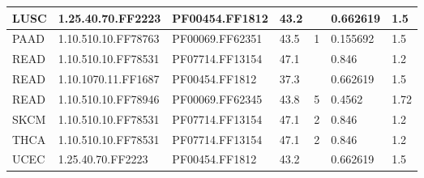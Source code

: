 \documentclass[a4paper, 11pt]{article}
\begin{document}
\begin{table}[!htbp]
\begin{tabular}{|l|l|l|l|l|l|l|}
LUSC         & 1.25.40.70.FF2223    & PF00454.FF1812  & 43.2      &             & 0.662619          & 1.5      \\ \hline
PAAD         & 1.10.510.10.FF78763  & PF00069.FF62351 & 43.5      & 1           & 0.155692          & 1.5      \\ \hline
READ         & 1.10.510.10.FF78531  & PF07714.FF13154 & 47.1      &             & 0.846             & 1.2      \\ \hline
READ         & 1.10.1070.11.FF1687  & PF00454.FF1812  & 37.3      &             & 0.662619          & 1.5      \\ \hline
READ         & 1.10.510.10.FF78946  & PF00069.FF62345 & 43.8      & 5           & 0.4562            & 1.72     \\ \hline
SKCM         & 1.10.510.10.FF78531  & PF07714.FF13154 & 47.1      & 2           & 0.846             & 1.2      \\ \hline
THCA         & 1.10.510.10.FF78531  & PF07714.FF13154 & 47.1      & 2           & 0.846             & 1.2      \\ \hline
UCEC         & 1.25.40.70.FF2223    & PF00454.FF1812  & 43.2      &             & 0.662619          & 1.5      \\ \hline
\end{tabular}
\end{table}


\newpage


\end{document}
